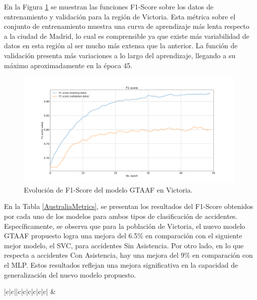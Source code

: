 \documentclass{uathesis-es}
\begin{document}
{En la Figura \ref{VictoriaLossFunction} se muestran las funciones F1-Score sobre los datos de entrenamiento y validación para la región de Victoria. Esta métrica sobre el conjunto de entrenamiento muestra una curva de aprendizaje más lenta respecto a la ciudad de Madrid, lo cual es comprensible ya que existe más variabilidad de datos en esta región al ser mucho más extensa que la anterior. La función de validación presenta más variaciones a lo largo del aprendizaje, llegando a su máximo aproximadamente en la época 45.

\begin{figure}[H]
\centering
    \includegraphics[width=160mm]{Figures/Victoria/Victoria_convolution_2d_f1_score_paper.png}
    \caption{Evolución de F1-Score del modelo GTAAF en Victoria.}
\label{VictoriaLossFunction}
\end{figure}

En la Tabla \ref{AustraliaMetrics}, se presentan los resultados del F1-Score obtenidos por cada uno de los modelos para ambos tipos de clasificación de accidentes. Específicamente, se observa que para la población de Victoria, el nuevo modelo GTAAF propuesto logra una mejora del 6.5\% en comparación con el siguiente mejor modelo, el SVC, para accidentes Sin Asistencia. Por otro lado, en lo que respecta a accidentes Con Asistencia, hay una mejora del 9\% en comparación con el MLP. Estos resultados reflejan una mejora significativa en la capacidad de generalización del nuevo modelo propuesto.


\begin{table}[H]
    \begin{center}
        \begin{tabular}{|c|c||c|c|c|c|c|c|}
        \hline
         &
         \\ \hline


\end{tabular}
\end{center}
\end{table}}
\end{document}
